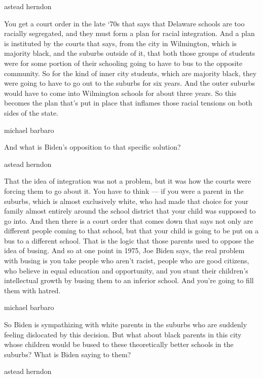 astead herndon

You get a court order in the late `70s that says that Delaware schools
are too racially segregated, and they must form a plan for racial
integration. And a plan is instituted by the courts that says, from the
city in Wilmington, which is majority black, and the suburbs outside of
it, that both those groups of students were for some portion of their
schooling going to have to bus to the opposite community. So for the
kind of inner city students, which are majority black, they were going
to have to go out to the suburbs for six years. And the outer suburbs
would have to come into Wilmington schools for about three years. So
this becomes the plan that's put in place that inflames those racial
tensions on both sides of the state.

michael barbaro

And what is Biden's opposition to that specific solution?

astead herndon

That the idea of integration was not a problem, but it was how the
courts were forcing them to go about it. You have to think --- if you
were a parent in the suburbs, which is almost exclusively white, who had
made that choice for your family almost entirely around the school
district that your child was supposed to go into. And then there is a
court order that comes down that says not only are different people
coming to that school, but that your child is going to be put on a bus
to a different school. That is the logic that those parents used to
oppose the idea of busing. And so at one point in 1975, Joe Biden says,
the real problem with busing is you take people who aren't racist,
people who are good citizens, who believe in equal education and
opportunity, and you stunt their children's intellectual growth by
busing them to an inferior school. And you're going to fill them with
hatred.

michael barbaro

So Biden is sympathizing with white parents in the suburbs who are
suddenly feeling dislocated by this decision. But what about black
parents in this city whose children would be bused to these
theoretically better schools in the suburbs? What is Biden saying to
them?

astead herndon

